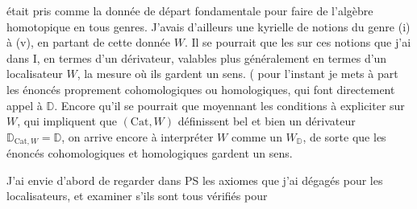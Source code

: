 
était pris comme la donnée de départ fondamentale pour faire de l'algèbre homotopique en tous genres. J'avais d'ailleurs  une kyrielle de notions du  genre (i) à (v), en partant de cette donnée $W$. Il se pourrait que  les    sur ces notions que j'ai  dans $\mathrm I$, en termes d'un dérivateur,  valables plus généralement en termes d'un localisateur $W$,   la mesure  où ils gardent un sens. ( pour l'instant je mets à part les énoncés proprement cohomologiques ou homologiques, qui font directement appel à $\mathbb D$. Encore qu'il se pourrait que moyennant les conditions à expliciter sur $W$, qui impliquent que $(\mathrm{Cat},W)$ définissent bel et bien un dérivateur $\mathbb D_{\mathrm{Cat},W}=\mathbb D$, on arrive encore à interpréter $W$ comme un $W_{\mathbb D}$, de sorte que les énoncés cohomologiques et homologiques gardent un sens.

J'ai envie d'abord de regarder dans PS les axiomes que j'ai dégagés pour les localisateurs, et examiner s'ils sont tous vérifiés pour
